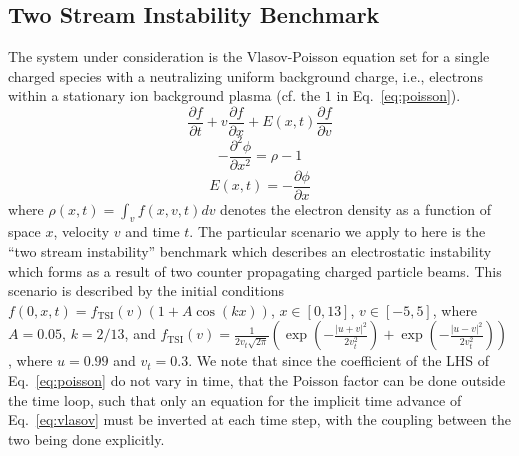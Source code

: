 \subsection*{Two Stream Instability Benchmark}
The system under consideration is the Vlasov-Poisson equation set for a single charged species with a neutralizing uniform background charge, i.e., electrons within a stationary ion background plasma (cf. the $1$ in Eq.~\ref{eq:poisson}). 
\begin{equation}
    \frac{\partial f}{\partial t}+v\frac{\partial f}{\partial x}+E\left(x,t\right)\frac{\partial f}{\partial v}
    \label{eq:vlasov}
\end{equation}
%
\begin{equation}
-\frac{\partial^2\phi}{\partial x^2}=\rho-1
    \label{eq:poisson}
\end{equation}
%
\begin{equation}
E\left(x,t\right)=-\frac{\partial\phi}{\partial x}
    \label{eq:E}
\end{equation}
where $\rho\left(x,t\right)=\int_v f\left(x,v,t\right) dv$ denotes the electron density as a function of space $x$, velocity $v$ and time $t$. The particular scenario we apply \asgard to here is the ``two stream instability'' benchmark which describes an electrostatic instability which forms as a result of two counter propagating charged particle beams. This scenario is described by the initial conditions $f\left(0,x,t\right)=f_{\mathrm{TSI}}\left(v\right)\left(1+A \cos\left(k x\right)\right)$, 
$x\in\left[0,13\right]$, $v\in\left[-5,5\right]$, 
where $A=0.05$, $k=2/13$, 
and 
$f_{\mathrm{TSI}}
\left(v\right)
=
\frac{1}{2 v_t \sqrt{2\pi}}
\left(
\exp\left(-\frac{\left|u+v\right|^2}{2v_t^2}\right)
+
\exp\left(-\frac{\left|u-v\right|^2}{2v_t^2}\right)
\right)$, where $u=0.99$ and $v_t=0.3$. We note that since the coefficient of the LHS of Eq.~\ref{eq:poisson} do not vary in time, that the Poisson factor can be done outside the time loop, such that only an equation for the implicit time advance of Eq.~\ref{eq:vlasov} must be inverted at each time step, with the coupling between the two being done explicitly. 
